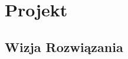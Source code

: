 
\chapter{Projekt}
\label{sec:projekt}


\section{Wizja Rozwiązania}
\label{sec:wizja_rozwiazania}



